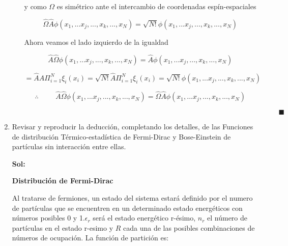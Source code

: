 \documentclass[12pt,a4paper]{article}
\begin{document}
\begin{enumerate}
\begin{enumerate}
    y como $\Omega$ es simétrico ante el intercambio de coordenadas espín-espaciales
    
    \begin{equation*}
        \hat{\Omega} \hat{A} \phi(x_1,...x_j,...,x_k,...,x_N) = \sqrt{N!} \phi(x_1,...x_j,...,x_k,...,x_N)
    \end{equation*}
    
    Ahora veamos el lado  izquierdo de la igualdad
    
    \begin{equation*}
        \hat{A} \hat{\Omega} \phi(x_1,...x_j,...,x_k,...,x_N) = \hat{A} \phi(x_1,...x_j,...,x_k,...,x_N)
    \end{equation*}
    
    \begin{equation*}
        =\hat{A} \hat{A} \Pi_{i=1}^{N} \xi_{i} (x_i) = \sqrt{N!} \hat{A} \Pi_{i=1}^{N} \xi_{i} (x_i) = \sqrt{N!} \phi(x_1,...x_j,...,x_k,...,x_N)
    \end{equation*}
    
    \begin{equation*}
        \therefore \hspace{1cm} \hat{A}\hat{\Omega}\phi(x_1,...x_j,...,x_k,...,x_N) = \hat{\Omega} \hat{A}\phi(x_1,...x_j,...,x_k,...,x_N)
    \end{equation*}
    
    $\hspace{15cm} \blacksquare$
    
    
    
\end{enumerate}









\item Revisar y reproducir la deducción, completando los detalles, de las Funciones de distribución Térmico-estadística de Fermi-Dirac y Bose-Einstein de partículas sin interacción entre ellas.

\textbf{Sol:}

\textbf{Distribución de Fermi-Dirac}

Al tratarse de fermiones, un estado del sistema estará definido por el numero de partículas que se encuentren en un determinado estado energéticos con números posibles 0 y 1.$\epsilon_r$ será el estado energético r-ésimo, $n_r$ el número de partículas en el estado r-esimo y $R$ cada una de las posibles combinaciones de números de ocupación. La función de partición es:


\end{enumerate}
\end{document}
